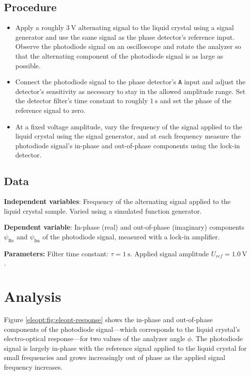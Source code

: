 \documentclass[11pt, a4paper]{article}
\begin{document}
\subsection{Procedure}
\begin{itemize}
	\item Apply a roughly $ \SI{3}{\volt} $ alternating signal to the liquid crystal using a signal generator and use the same signal as the phase detector's reference input. Observe the photodiode signal on an oscilloscope and rotate the analyzer so that the alternating component of the photodiode signal is as large as possible. 
		
			
	\item Connect the photodiode signal to the phase detector's \texttt{A} input and adjust the detector's sensitivity as necessary to stay in the allowed amplitude range. Set the detector filter's time constant to roughly $ \SI{1}{\second} $ and set the phase of the reference signal to zero.
	
	\item At a fixed voltage amplitude, vary the frequency of the signal applied to the liquid crystal using the signal generator, and at each frequency measure the photodiode signal's in-phase and out-of-phase components using the lock-in detector.
\end{itemize}



\subsection{Data}
\textbf{Independent variables}: Frequency of the alternating signal applied to the liquid crystal sample. Varied using a simulated function generator. 
	
\vspace{2mm}
\textbf{Dependent variable}: In-phase (real) and out-of-phase (imaginary) components $ \psi_{\text{Re}} $ and $ \psi_{\text{Im}} $ of the photodiode signal, measured with a lock-in amplifier.

\vspace{2mm}
\textbf{Parameters:} Filter time constant: $ \tau = \SI{1}{\second} $. Applied signal amplitude $ U_{ref} = \SI{1.0}{\volt} $. 


\section{Analysis}

Figure \ref{eleopt:fig:eleopt-response} shows the in-phase and out-of-phase components of the photodiode signal---which corresponds to the liquid crystal's electro-optical response---for two values of the analyzer angle $ \phi $. The photodiode signal is largely in-phase with the reference signal applied to the liquid crystal for small frequencies and grows increasingly out of phase as the applied signal frequency increases. 
\end{document}
